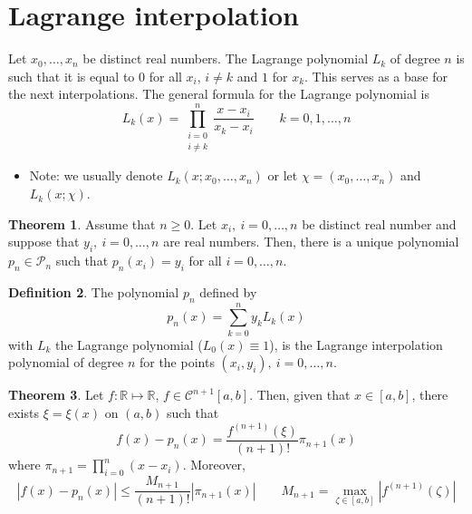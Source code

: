 \documentclass[12pt, openany]{report}
\newcommand{\R}{\mathbb{R}}
\theoremstyle{definition}
\newtheorem{thm}{Theorem}[chapter]
\newtheorem{definition}[thm]{Definition}
\begin{document}
\section{Lagrange interpolation}
Let \(x_0,\dots,x_n\) be distinct real numbers. The Lagrange polynomial \(L_k\) of degree \(n\) is such that it is equal to 0 for all \(x_i\), \(i\neq k\) and \(1\) for \(x_k\). This serves as a base for the next interpolations. The general formula for the Lagrange polynomial is 
\begin{equation}
    L_k(x) = \prod_{\substack{i=0\\ i\neq k}}^n \frac{x-x_i}{x_k-x_i}\qquad k=0,1,\dots,n
\end{equation}
\begin{itemize}
    \item Note: we usually denote \(L_k(x;x_0,\dots,x_n)\) or let \(\chi = (x_0,\dots,x_n)\) and \(L_k(x;\chi)\). 
\end{itemize}
\begin{thm}
    Assume that $n\ge 0$. Let $x_i,\: i=0,\dots,n$ be distinct real number and suppose that $y_i,\: i=0,\dots,n$ are real numbers. Then, there is a unique polynomial $p_n\in \mathcal{P}_n$ such that $p_n(x_i)=y_i$ for all $i=0,\dots,n$.
\end{thm}
\begin{definition}
    The polynomial $p_n$ defined by 
    \begin{equation}\label{eq:lagrange}
        p_n(x) = \sum_{k=0}^n y_kL_k(x)
    \end{equation}
    with $L_k$ the Lagrange polynomial ($L_0(x) \equiv 1$), is the Lagrange interpolation polynomial of degree $n$ for the points $(x_i,y_i),\: i=0,\dots,n$.
\end{definition}
\begin{thm}
    Let $f:\R\mapsto \R$, $f\in \mathcal{C}^{n+1}[a,b]$. Then, given that $x\in[a,b]$, there exists $\xi=\xi(x)$ on $(a,b)$ such that 
    \begin{equation}
        f(x)-p_n(x) = \frac{f^{(n+1)}(\xi)}{(n+1)!}\pi_{n+1}(x)
    \end{equation}
    where $\pi_{n+1} = \prod_{i=0}^n(x-x_i)$. Moreover, 
    \begin{equation}
        |f(x)-p_n(x)| \le \frac{M_{n+1}}{(n+1)!}|\pi_{n+1}(x)| \qquad M_{n+1} = \max_{\zeta \in [a,b]}|f^{(n+1)}(\zeta)|
    \end{equation}
\end{thm}
\end{document}
